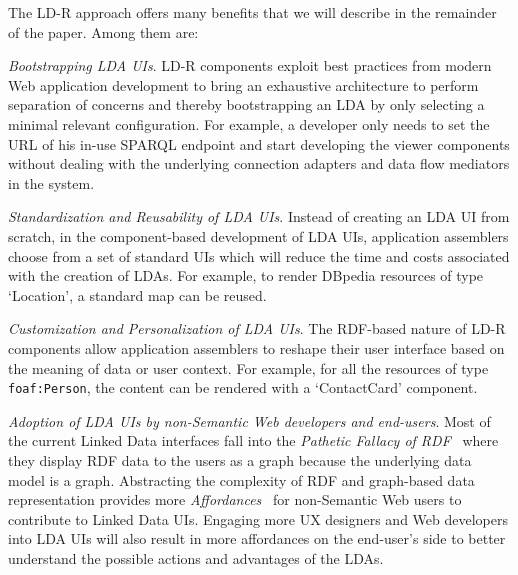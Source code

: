 \documentclass{llncs}
\begin{document}
The LD-R approach offers many benefits that we will describe in the remainder of the paper. Among them are:
\begin{compactitem}
\item \emph{Bootstrapping LDA UIs}.
LD-R components exploit best practices from modern Web application development to bring an exhaustive architecture to perform separation of concerns and thereby bootstrapping an LDA by only selecting a minimal relevant configuration.
For example, a developer only needs to set the URL of his in-use SPARQL endpoint and start developing the viewer components without dealing with the underlying connection adapters and data flow mediators in the system.

\item \emph{Standardization and Reusability of LDA UIs}.
Instead of creating an LDA UI from scratch, in the component-based development of LDA UIs, application assemblers choose from a set of standard UIs which will reduce the time and costs associated with the creation of LDAs.
For example, to render DBpedia resources of type `Location', a standard map can be reused.

\item \emph{Customization and Personalization of LDA UIs}.
The RDF-based nature of LD-R components allow application assemblers to reshape their user interface based on the meaning of data or user context.
For example, for all the resources of type \texttt{foaf:Person}, the content can be rendered with a `ContactCard' component.

\item \emph{Adoption of LDA UIs by non-Semantic Web developers and end-users}.
Most of the current Linked Data interfaces fall into the \emph{Pathetic Fallacy of RDF}~\cite{Karger2006} where they display RDF data to the users as a graph because the underlying data model is a graph.
Abstracting the complexity of RDF and graph-based data representation provides more \emph{Affordances}~\cite{Norman2013} for non-Semantic Web users to contribute to Linked Data UIs.
Engaging more UX designers and Web developers into LDA UIs will also result in more affordances on the end-user's side to better understand the possible actions and advantages of the LDAs.
\end{compactitem}
\end{document}
